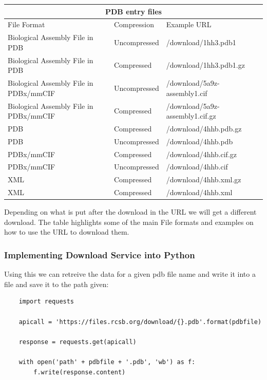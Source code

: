 \documentclass[]{final_report}
\begin{document}
\begin{tabular}{ |p{5.5cm}|p{2.5cm}|p{6cm}|  }
    \hline
    \multicolumn{3}{|c|}{PDB entry files} \\
    \hline
    File Format&Compression&Example URL\\
    \hline
    Biological Assembly File in PDB&Uncompressed&/download/1hh3.pdb1\\
    \hline
    Biological Assembly File in PDB&Compressed&/download/1hh3.pdb1.gz\\
    \hline
    Biological Assembly File in PDBx/mmCIF&Uncompressed&/download/5a9z-assembly1.cif\\
    \hline
    Biological Assembly File in PDBx/mmCIF&Compressed&/download/5a9z-assembly1.cif.gz\\
    \hline
    PDB&Compressed&/download/4hhb.pdb.gz\\
    \hline
    PDB&Uncompressed&/download/4hhb.pdb\\
    \hline
    PDBx/mmCIF&Compressed&/download/4hhb.cif.gz\\
    \hline
    PDBx/mmCIF&Uncompressed&/download/4hhb.cif\\
    \hline
    XML&Compressed&/download/4hhb.xml.gz\\
    \hline
    XML&Compressed&/download/4hhb.xml\\
    \hline
    
\end{tabular}

Depending on what is put after the download in the URL we will get a different download. The table highlights some of the main File formats and examples on how to use the URL to download them.

\subsubsection{Implementing Download Service into Python}

Using this we can retreive the data for a given pdb file name and write it into a file and save it to the path given:

\begin{lstlisting}
    import requests

    apicall = 'https://files.rcsb.org/download/{}.pdb'.format(pdbfile)

    response = requests.get(apicall)

    with open('path' + pdbfile + '.pdb', 'wb') as f:
        f.write(response.content)

\end{lstlisting}
\end{document}
